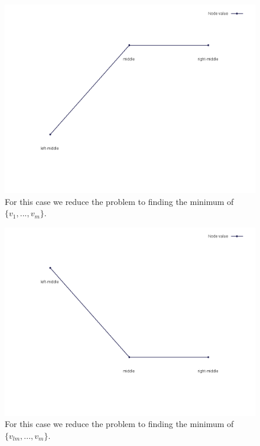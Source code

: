 \documentclass[12pt]{article}
\begin{document}
    \begin{figure}[H]
        \centering
        \includegraphics[scale=.35]{mid_case5}
        \caption{For this case we reduce the problem to finding the minimum of $\{v_1, ..., v_m\}$.}
    \end{figure}
    \begin{figure}[H]
        \centering
        \includegraphics[scale=.35]{mid_case6}
        \caption{For this case we reduce the problem to finding the minimum of $\{v_{lm}, ..., v_m\}$.}
    \end{figure}
\end{document}

